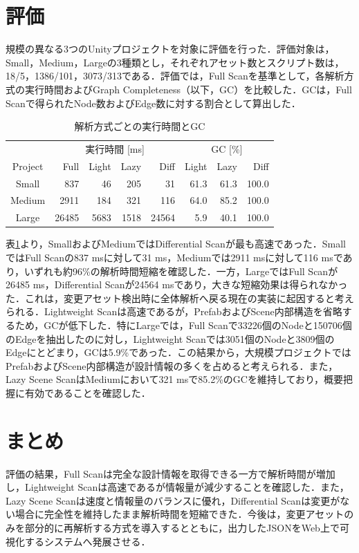 \documentclass[twocolumn,a4paper,dvipdfmx]{ieicejsp}
\begin{document}
\section{評価}

規模の異なる3つのUnityプロジェクトを対象に評価を行った．評価対象は，Small，Medium，Largeの3種類とし，それぞれアセット数とスクリプト数は，18/5，1386/101，3073/313である．評価では，Full Scanを基準として，各解析方式の実行時間およびGraph Completeness（以下，GC）を比較した．GCは，Full Scanで得られたNode数およびEdge数に対する割合として算出した．

\begin{table}[hbt]
  \centering
  \caption{解析方式ごとの実行時間とGC}
  \label{tab:evaluation}
  \vspace{4pt}
  \begin{tabular}{c|rrrr|rrr}
    \hline
    &\multicolumn{4}{c|}{実行時間 [ms]} & \multicolumn{3}{c}{GC [\%]} \\
     Project & Full & Light & Lazy & Diff & Light & Lazy & Diff \\
    \hline
    Small  & 837   & 46   & 205  & 31    & 61.3 & 61.3 & 100.0 \\
    Medium & 2911  & 184  & 321  & 116   & 64.0 & 85.2 & 100.0 \\
    Large  & 26485 & 5683 & 1518 & 24564 & 5.9  & 40.1 & 100.0 \\
    \hline
  \end{tabular}
\end{table}

表\ref{tab:evaluation}より，SmallおよびMediumではDifferential Scanが最も高速であった．SmallではFull Scanの837 msに対して31 ms，Mediumでは2911 msに対して116 msであり，いずれも約96\%の解析時間短縮を確認した．一方，LargeではFull Scanが26485 ms，Differential Scanが24564 msであり，大きな短縮効果は得られなかった．これは，変更アセット検出時に全体解析へ戻る現在の実装に起因すると考えられる．Lightweight Scanは高速であるが，PrefabおよびScene内部構造を省略するため，GCが低下した．特にLargeでは，Full Scanで33226個のNodeと150706個のEdgeを抽出したのに対し，Lightweight Scanでは3051個のNodeと3809個のEdgeにとどまり，GCは5.9\%であった．この結果から，大規模プロジェクトではPrefabおよびScene内部構造が設計情報の多くを占めると考えられる．また，Lazy Scene ScanはMediumにおいて321 msで85.2\%のGCを維持しており，概要把握に有効であることを確認した．


\section{まとめ}

評価の結果，Full Scanは完全な設計情報を取得できる一方で解析時間が増加し，Lightweight Scanは高速であるが情報量が減少することを確認した．また，Lazy Scene Scanは速度と情報量のバランスに優れ，Differential Scanは変更がない場合に完全性を維持したまま解析時間を短縮できた．今後は，変更アセットのみを部分的に再解析する方式を導入するとともに，出力したJSONをWeb上で可視化するシステムへ発展させる．



\end{document}
